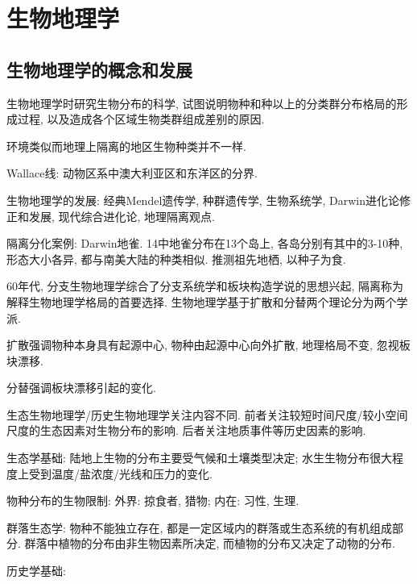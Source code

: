 \documentclass{ctexart}
\begin{document}
\section{生物地理学} %
\label{sec:生物地理学}

\subsection{生物地理学的概念和发展} %
\label{sub:生物地理学的概念和发展}

生物地理学时研究生物分布的科学, 试图说明物种和种以上的分类群分布格局的形成过程, 以及造成各个区域生物类群组成差别的原因.
\begin{theorem}[Buffon定律]
    环境类似而地理上隔离的地区生物种类并不一样.
\end{theorem}
Wallace线: 动物区系中澳大利亚区和东洋区的分界.
\par
生物地理学的发展: 经典Mendel遗传学, 种群遗传学, 生物系统学, Darwin进化论修正和发展, 现代综合进化论, 地理隔离观点.
\par
隔离分化案例: Darwin地雀. 14中地雀分布在13个岛上, 各岛分别有其中的3-10种, 形态大小各异, 都与南美大陆的种类相似. 推测祖先地栖, 以种子为食.
\par
60年代, 分支生物地理学综合了分支系统学和板块构造学说的思想兴起, 隔离称为解释生物地理学格局的首要选择. 生物地理学基于扩散和分替两个理论分为两个学派.
\par
扩散强调物种本身具有起源中心, 物种由起源中心向外扩散, 地理格局不变, 忽视板块漂移.
\par
分替强调板块漂移引起的变化.
\par
生态生物地理学/历史生物地理学关注内容不同. 前者关注较短时间尺度/较小空间尺度的生态因素对生物分布的影响. 后者关注地质事件等历史因素的影响.
\par
生态学基础: 陆地上生物的分布主要受气候和土壤类型决定; 水生生物分布很大程度上受到温度/盐浓度/光线和压力的变化.
\par
物种分布的生物限制: 外界: 掠食者, 猎物; 内在: 习性, 生理.
\par
群落生态学: 物种不能独立存在, 都是一定区域内的群落或生态系统的有机组成部分. 群落中植物的分布由非生物因素所决定, 而植物的分布又决定了动物的分布.
\par
历史学基础:
\end{document}
